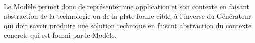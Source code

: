 Le Modèle permet donc de représenter une application et son contexte en faisant abstraction de la technologie ou de la plate-forme cible, à l'inverse du Générateur qui doit savoir produire une solution technique en faisant abstraction du contexte concret, qui est fourni par le Modèle.




